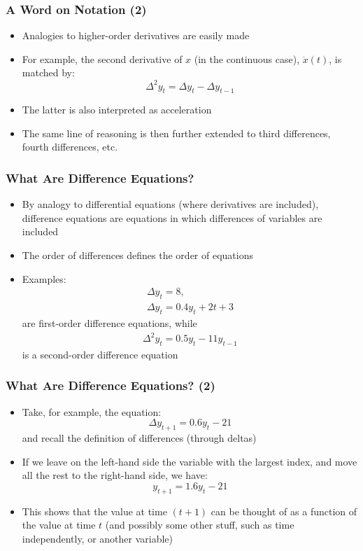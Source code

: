\documentclass[10pt,usenames,dvipsnames]{beamer}
\theoremstyle{definition}
\begin{document}
\begin{frame}[fragile]
\frametitle{A Word on Notation (2)}
\begin{itemize}
	\item Analogies to higher-order derivatives are easily made
	\item For example, the second derivative of $x$ (in the continuous case), $\ddot{x}(t)$, is matched by:
	\[
		\Delta^{2}y_{t} = \Delta y_{t} - \Delta y_{t-1}
	\]
	\item The latter is also interpreted as acceleration
	\item The same line of reasoning is then further extended to third differences, fourth differences, etc.
\end{itemize}
\end{frame}

\begin{frame}[fragile]
\frametitle{What Are Difference Equations?}
\begin{itemize}
	\item By analogy to differential equations (where derivatives are included), difference equations are equations in which differences of variables are included
	\item The order of differences defines the order of equations
	\item Examples:
	\[
		\begin{array}{lcl}
			\Delta y_{t} = 8,\\
			\Delta y_{t} = 0.4y_{t} + 2t + 3
		\end{array}
	\]
	are first-order difference equations, while
	\[
		\begin{array}{lcl}
			\Delta^{2}y_{t} = 0.5y_{t} - 11y_{t-1}
		\end{array}
	\]
	is a second-order difference equation
\end{itemize}
\end{frame}

\begin{frame}[fragile]
\frametitle{What Are Difference Equations? (2)}
\begin{itemize}
	\item Take, for example, the equation:
	\[
		\Delta y_{t+1} = 0.6y_{t} - 21
	\]
	and recall the definition of differences (through deltas)
	\item If we leave on the left-hand side the variable with the largest index, and move all the rest to the right-hand side, we have:
	\[
		y_{t+1} =  1.6y_{t} - 21
	\]
	\item This shows that the value at time $(t+1)$ can be thought of as a function of the value at time $t$ (and possibly some other stuff, such as time independently, or another variable)
\end{itemize}
\end{frame}
\end{document}
